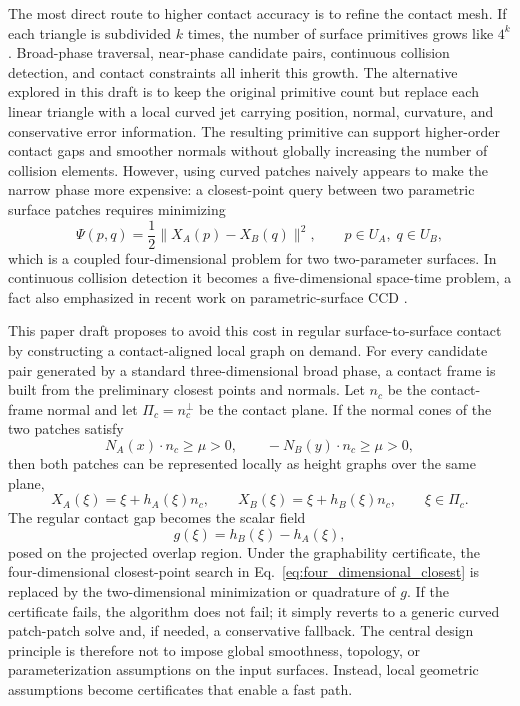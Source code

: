 \documentclass[preprint,12pt]{elsarticle}
\begin{document}
The most direct route to higher contact accuracy is to refine the contact mesh. If each triangle is subdivided $k$ times, the number of surface primitives grows like $4^k$. Broad-phase traversal, near-phase candidate pairs, continuous collision detection, and contact constraints all inherit this growth. The alternative explored in this draft is to keep the original primitive count but replace each linear triangle with a local curved jet carrying position, normal, curvature, and conservative error information. The resulting primitive can support higher-order contact gaps and smoother normals without globally increasing the number of collision elements. However, using curved patches naively appears to make the narrow phase more expensive: a closest-point query between two parametric surface patches requires minimizing
\begin{equation}
    \Psi(p,q)=\frac{1}{2}\|X_A(p)-X_B(q)\|^2,\qquad p\in U_A,\; q\in U_B,
    \label{eq:four_dimensional_closest}
\end{equation}
which is a coupled four-dimensional problem for two two-parameter surfaces. In continuous collision detection it becomes a five-dimensional space-time problem, a fact also emphasized in recent work on parametric-surface CCD \cite{chen2024tdib}.

This paper draft proposes to avoid this cost in regular surface-to-surface contact by constructing a contact-aligned local graph on demand. For every candidate pair generated by a standard three-dimensional broad phase, a contact frame is built from the preliminary closest points and normals. Let $n_c$ be the contact-frame normal and let $\Pi_c=n_c^\perp$ be the contact plane. If the normal cones of the two patches satisfy
\begin{equation}
    N_A(x)\cdot n_c\ge \mu>0,
    \qquad
    -N_B(y)\cdot n_c\ge \mu>0,
    \label{eq:intro_graphability}
\end{equation}
then both patches can be represented locally as height graphs over the same plane,
\begin{equation}
    X_A(\xi)=\xi+h_A(\xi)n_c,
    \qquad
    X_B(\xi)=\xi+h_B(\xi)n_c,
    \qquad \xi\in \Pi_c.
\end{equation}
The regular contact gap becomes the scalar field
\begin{equation}
    g(\xi)=h_B(\xi)-h_A(\xi),
    \label{eq:intro_gap}
\end{equation}
posed on the projected overlap region. Under the graphability certificate, the four-dimensional closest-point search in Eq.~\eqref{eq:four_dimensional_closest} is replaced by the two-dimensional minimization or quadrature of $g$. If the certificate fails, the algorithm does not fail; it simply reverts to a generic curved patch-patch solve and, if needed, a conservative fallback. The central design principle is therefore not to impose global smoothness, topology, or parameterization assumptions on the input surfaces. Instead, local geometric assumptions become certificates that enable a fast path.
\end{document}
